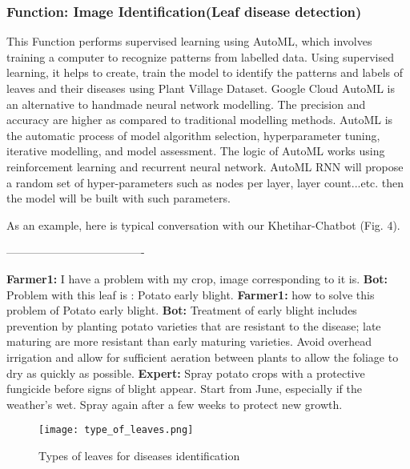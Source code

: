 \documentclass[10pt,conference]{IEEEtran}
\begin{document}
	


\subsubsection{ Function: Image Identification(Leaf disease detection)}


{\raggedright
This Function performs supervised learning using AutoML, which involves training a computer to recognize patterns from labelled data. Using supervised learning, it helps to create, train the model to identify the patterns and labels of leaves and their diseases using Plant Village Dataset. Google Cloud AutoML is an alternative to handmade neural network modelling. The precision and accuracy are higher as compared to traditional modelling methods. AutoML is the automatic process of model algorithm selection, hyperparameter tuning, iterative modelling, and model assessment. The logic of AutoML works using reinforcement learning and recurrent neural network. AutoML RNN will propose a random set of hyper-parameters such as nodes per layer, layer count...etc. then the model will be built with such parameters.
}


{\raggedright
As an example, here is typical conversation with our Khetihar-Chatbot (Fig. 4).
}

{\raggedright
-------------------------------------
}


{\raggedright
\textbf{Farmer1:} I have a problem with my crop, image corresponding to it is.
\newline
\textbf{Bot:}  Problem with this leaf is : Potato early blight.
\newline
\textbf{Farmer1:} how to solve this problem of Potato early blight.
\newline
\textbf{Bot:} Treatment of early blight includes prevention by planting potato varieties that are resistant to the disease; late maturing are more resistant than early maturing varieties. Avoid overhead irrigation and allow for sufficient aeration between plants to allow the foliage to dry as quickly as possible.
\newline
\textbf{Expert:} Spray potato crops with a protective fungicide before signs of blight appear. Start from June, especially if the weather's wet. Spray again after a few weeks to protect new growth.
\newline
}

\begin{figure}[h]
 \centering
   \texttt{[image: type\_of\_leaves.png]}
  \caption{Types of leaves for diseases identification }
\end{figure}
\end{document}
